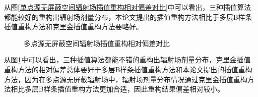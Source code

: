 从图\ref{单点源无屏蔽空间辐射场插值重构相对偏差对比}中可以看出，三种插值算法都能较好的重构出辐射场剂量分布，本论文提出的插值重构方法相比于多层B样条插值重构方法和克里金插值重构方法要略好。

\begin{figure}[htbp]
    \centering
    \caption{多点源无屏蔽空间辐射场插值重构相对偏差对比}
    \label{多点源无屏蔽空间辐射场插值重构相对偏差对比}
\end{figure}

从图\ref{多点源无屏蔽空间辐射场插值重构相对偏差对比}中可以看出，三种插值算法都能不错的重构出辐射场剂量分布，克里金插值重构方法的相对偏差总体要好于多层B样条插值重构方法和本论文提出的插值重构方法，因为在多点源无屏蔽辐射场中，辐射场剂量分布情况通过克里金插值重构方法相比多层B样条插值重构方法更加合适，因此重构结果偏差相对较小。

